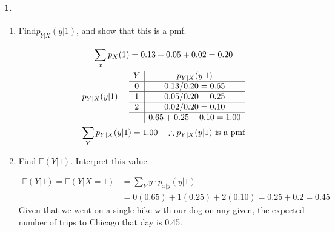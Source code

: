     \paragraph*{1.}\hbox{}
    \begin{enumerate}[label=(\alph*)]
        \item Find$ p_{Y|X}(y|1)$, and show that this is a pmf.
        \\
        \begin{mdframed}
            \begin{equation*}
                \begin{gathered}
                    \sum_x p_X(1) = 0.13 + 0.05 + 0.02 = 0.20   \\
                    p_{Y|X}(y|1) =  \begin{array}{c | c}
                        Y & p_{Y|X}(y|1)                        \\
                        \hline
                        0 & 0.13 / 0.20 = 0.65                  \\
                        \hline
                        1 & 0.05 / 0.20 = 0.25                  \\
                        \hline
                        2 & 0.02 / 0.20 = 0.10                  \\
                        \hline
                          & 0.65 + 0.25 + 0.10 = 1.00
                    \end{array}                                 \\
                    \sum_{Y}p_{Y|X}(y|1) = 1.00 \quad \therefore p_{Y|X}(y|1) \text { is a pmf}
                \end{gathered}
            \end{equation*}
        \end{mdframed}

        \item Find $\mathbb{E}(Y|1)$. Interpret this value.
        \\
        \begin{mdframed}
            \begin{align*}
                \mathbb{E}(Y|1) = \mathbb{E}(Y|X=1) & = \sum_{Y}y \cdot p_{x|y}(y|1)        \\
                                                    & = 0(0.65) + 1(0.25) + 2(0.10) = 0.25 + 0.2 = \boxed{0.45}
            \end{align*}
            Given that we went on a single hike with our dog on any given, the expected number of trips to Chicago that day is 0.45.
        \end{mdframed}


\end{enumerate}
